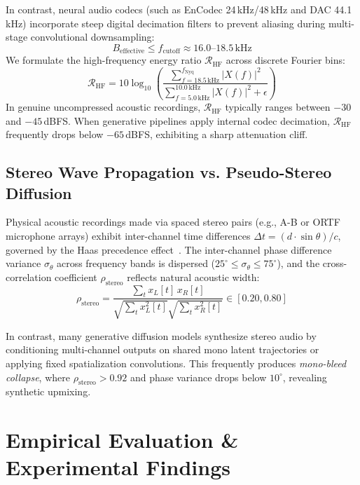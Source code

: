 \documentclass[conference]{IEEEtran}
\theoremstyle{definition}
\begin{document}
In contrast, neural audio codecs (such as EnCodec 24\,kHz/48\,kHz and DAC 44.1\,kHz) incorporate steep digital decimation filters to prevent aliasing during multi-stage convolutional downsampling:
\begin{equation}
B_{\text{effective}} \le f_{\text{cutoff}} \approx 16.0\text{--}18.5\,\text{kHz}
\end{equation}
We formulate the high-frequency energy ratio $\mathcal{R}_{\text{HF}}$ across discrete Fourier bins:
\begin{equation}
\mathcal{R}_{\text{HF}} = 10 \log_{10} \left( \frac{\sum_{f = 18.5\,\text{kHz}}^{f_{\text{Nyq}}} |X(f)|^2}{\sum_{f = 5.0\,\text{kHz}}^{10.0\,\text{kHz}} |X(f)|^2 + \epsilon} \right)
\end{equation}
In genuine uncompressed acoustic recordings, $\mathcal{R}_{\text{HF}}$ typically ranges between $-30$ and $-45$\,dBFS. When generative pipelines apply internal codec decimation, $\mathcal{R}_{\text{HF}}$ frequently drops below $-65$\,dBFS, exhibiting a sharp attenuation cliff.

\subsection{Stereo Wave Propagation vs. Pseudo-Stereo Diffusion}
Physical acoustic recordings made via spaced stereo pairs (e.g., A-B or ORTF microphone arrays) exhibit inter-channel time differences $\Delta t = (d \cdot \sin\theta)/c$, governed by the Haas precedence effect~\cite{haas1951influence}. The inter-channel phase difference variance $\sigma_\theta$ across frequency bands is dispersed ($25^\circ \le \sigma_\theta \le 75^\circ$), and the cross-correlation coefficient $\rho_{\text{stereo}}$ reflects natural acoustic width:
\begin{equation}
\rho_{\text{stereo}} = \frac{\sum_{t} x_L[t] \, x_R[t]}{\sqrt{\sum_t x_L^2[t]} \sqrt{\sum_t x_R^2[t]}} \in [0.20, 0.80]
\end{equation}

In contrast, many generative diffusion models synthesize stereo audio by conditioning multi-channel outputs on shared mono latent trajectories or applying fixed spatialization convolutions. This frequently produces \textit{mono-bleed collapse}, where $\rho_{\text{stereo}} > 0.92$ and phase variance drops below $10^\circ$, revealing synthetic upmixing.

\section{Empirical Evaluation & Experimental Findings}
\end{document}
